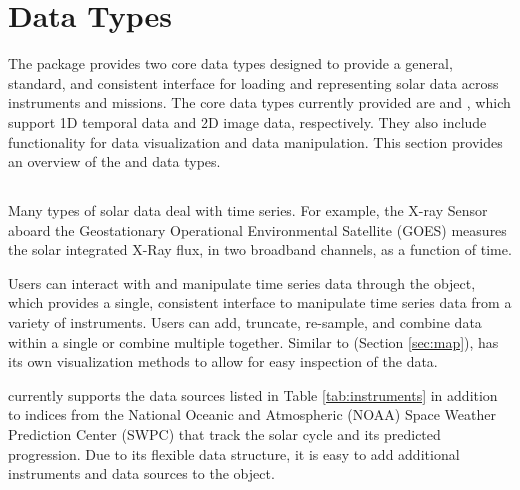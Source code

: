  \section{Data Types}
\label{sec:data_types}

The \sunpypkg package provides two core data types designed to provide a general, standard, and consistent interface for loading and representing solar data across instruments and missions.
The core data types currently provided are \Timeseries and \Map, which support 1D temporal data and 2D image data, respectively. 
They also include functionality for data visualization and data manipulation. 
This section provides an overview of the \Timeseries and \Map data types.

\subsection{\Timeseries}
\label{sec:timeseries}
Many types of solar data deal with time series. 
For example, the X-ray Sensor aboard the Geostationary Operational Environmental Satellite (GOES) measures the solar integrated X-Ray flux, in two broadband channels, as a function of time. 

Users can interact with and manipulate time series data through the \Timeseries object, which provides a single, consistent interface to manipulate time series data from a variety of instruments. 
Users can add, truncate, re-sample, and combine data within a single \Timeseries or combine multiple \Timeseries together. 
Similar to \Map (Section \ref{sec:map}), \Timeseries has its own visualization methods to allow for easy inspection of the data.

\Timeseries currently supports the data sources listed in Table \ref{tab:instruments} in addition to indices from the National Oceanic and Atmospheric (NOAA) Space Weather Prediction Center (SWPC) that track the solar cycle and its predicted progression. Due to its flexible data structure, it is easy to add additional instruments and data sources to the \Timeseries object.

